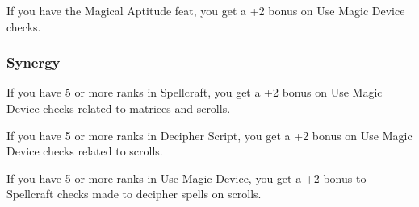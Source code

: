 If you have the Magical Aptitude feat, you get a +2 bonus on Use Magic Device checks.
\subsubsection{Synergy}
\begin{list}{}{\leftmargin=1em}
\item If you have 5 or more ranks in Spellcraft, you get a +2 bonus on Use Magic Device checks related to matrices and scrolls.
\item If you have 5 or more ranks in Decipher Script, you get a +2 bonus on Use Magic Device checks related to scrolls.
\item If you have 5 or more ranks in Use Magic Device, you get a +2 bonus to Spellcraft checks made to decipher spells on scrolls.
\end{list}
